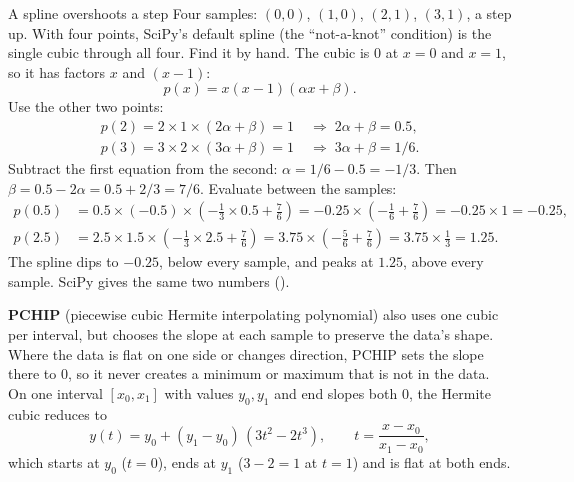 \begin{worked}[label={we:bandpipeline:overshoot}]{A spline overshoots a step}
Four samples: $(0, 0)$, $(1, 0)$, $(2, 1)$, $(3, 1)$, a step up. With four points, SciPy's default
spline (the ``not-a-knot'' condition) is the single cubic through all four. Find it by hand. The
cubic is $0$ at $x = 0$ and $x = 1$, so it has factors $x$ and $(x - 1)$:
\[ p(x) = x(x-1)(\alpha x + \beta). \]
Use the other two points:
\begin{align*}
p(2) = 2 \times 1 \times (2\alpha + \beta) = 1 \;&\Rightarrow\; 2\alpha + \beta = 0.5,\\
p(3) = 3 \times 2 \times (3\alpha + \beta) = 1 \;&\Rightarrow\; 3\alpha + \beta = 1/6.
\end{align*}
Subtract the first equation from the second: $\alpha = 1/6 - 0.5 = -1/3$. Then
$\beta = 0.5 - 2\alpha = 0.5 + 2/3 = 7/6$. Evaluate between the samples:
\begin{align*}
p(0.5) &= 0.5 \times (-0.5) \times \left(-\tfrac{1}{3}\times 0.5 + \tfrac{7}{6}\right)
        = -0.25 \times \left(-\tfrac{1}{6} + \tfrac{7}{6}\right) = -0.25 \times 1 = -0.25,\\
p(2.5) &= 2.5 \times 1.5 \times \left(-\tfrac{1}{3}\times 2.5 + \tfrac{7}{6}\right)
        = 3.75 \times \left(-\tfrac{5}{6} + \tfrac{7}{6}\right) = 3.75 \times \tfrac{1}{3} = 1.25.
\end{align*}
The spline dips to $-0.25$, below every sample, and peaks at $1.25$, above every sample. SciPy gives
the same two numbers ()\tagC.
\end{worked}

\textbf{PCHIP} (piecewise cubic Hermite interpolating polynomial) also uses one cubic
per interval, but chooses the slope at each sample to preserve the data's shape. Where the data is
flat on one side or changes direction, PCHIP sets the slope there to $0$, so it never creates a
minimum or maximum that is not in the data. On one interval $[x_0, x_1]$ with values $y_0, y_1$ and
end slopes both $0$, the Hermite cubic reduces to
\begin{equation}\label{eq:bandpipeline:hermite}
y(t) = y_0 + (y_1 - y_0)\,(3t^2 - 2t^3), \qquad t = \frac{x - x_0}{x_1 - x_0},
\end{equation}
which starts at $y_0$ ($t = 0$), ends at $y_1$ ($3 - 2 = 1$ at $t = 1$) and is flat at both ends.

